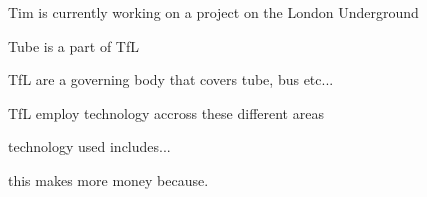 {}

Tim is currently working on a project on the London Underground

Tube is a part of TfL

TfL are a governing body that covers tube, bus etc...

TfL employ technology accross these different areas

technology used includes... 

this makes more money because.